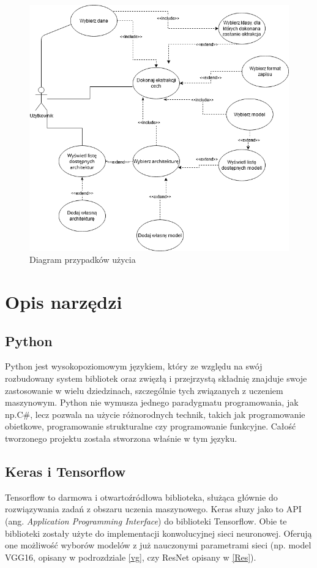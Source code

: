 \documentclass[a4paper,twoside,12pt]{book}
\newcommand{\obcy}[1]{\emph{#1}}
\newcommand{\ang}[1]{{\selectlanguage{british}\obcy{#1}}}
\begin{document}
{{\begin{figure}[h!]
\centering
\includegraphics[scale=0.40]{usecase.png}
\caption{Diagram przypadków użycia}
\label{usecase}
\end{figure}

}
\section{Opis narzędzi}

\subsection{Python}
{Python jest wysokopoziomowym językiem, który ze względu na swój rozbudowany system bibliotek oraz zwięzłą i przejrzystą składnię znajduje swoje zastosowanie w wielu dziedzinach, szczególnie tych związanych z uczeniem maszynowym. Python nie wymusza jednego paradygmatu programowania, jak np.C\#, lecz pozwala na użycie różnorodnych technik, takich jak programowanie obietkowe, programowanie strukturalne czy programowanie funkcyjne. Całość tworzonego projektu została stworzona właśnie w tym języku.}
\subsection{Keras i Tensorflow}
{Tensorflow to darmowa i otwartoźródłowa biblioteka, służąca głównie do rozwiązywania zadań z obszaru uczenia maszynowego. Keras słuzy jako to API (ang. \ang{Application Programming Interface}) do biblioteki Tensorflow. Obie te biblioteki zostały użyte do implementacji konwolucyjnej sieci neuronowej. Oferują one możliwość wyborów modelów z już nauczonymi parametrami sieci (np. model VGG16, opisany w podrozdziale \ref{vg}, czy ResNet opisany w \ref{Res}).}
}
\end{document}
